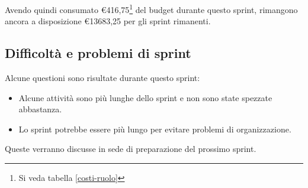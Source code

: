 Avendo quindi consumato €416,75\footnote{Si veda tabella \ref{costi-ruolo}} del budget durante questo sprint, rimangono ancora a disposizione €13683,25 per gli sprint rimanenti.

\subsection{Difficoltà e problemi di sprint}

Alcune questioni sono risultate durante questo sprint:

\begin{itemize}
    \item Alcune attività sono più lunghe dello sprint e non sono state spezzate abbastanza.
    \item Lo sprint potrebbe essere più lungo per evitare problemi di organizzazione. 
\end{itemize}

Queste verranno discusse in sede di preparazione del prossimo sprint.
